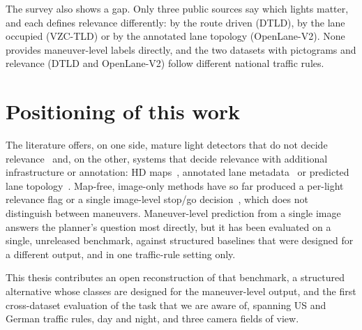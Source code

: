 The survey also shows a gap. Only three public sources say which lights matter, and each defines
relevance differently: by the route driven (DTLD), by the lane occupied (VZC-TLD) or by the annotated
lane topology (OpenLane-V2). None provides maneuver-level labels directly, and the two datasets with
pictograms and relevance (DTLD and OpenLane-V2) follow different national traffic rules.

\section{Positioning of this work}
\label{sec:bg-position}

The literature offers, on one side, mature light detectors that do not decide
relevance~\cite{behrendt2017deep,polley2024tldready} and, on the other, systems that decide relevance
with additional infrastructure or annotation: HD maps~\cite{fairfield2011traffic,polley2025atlas},
annotated lane metadata~\cite{langenberg2019deep} or predicted lane
topology~\cite{li2023graph,wu2024topomlp}. Map-free, image-only methods have so far produced a
per-light relevance flag or a single image-level stop/go decision~\cite{polley2024tldready,trinci2026color},
which does not distinguish between maneuvers. Maneuver-level prediction from a single
image~\cite{zou2026oneperception} answers the planner's question most directly, but it has been
evaluated on a single, unreleased benchmark, against structured baselines that were designed for a
different output, and in one traffic-rule setting only.

This thesis contributes an open reconstruction of that benchmark, a structured alternative whose
classes are designed for the maneuver-level output, and
the first cross-dataset evaluation of the task that we are aware of, spanning US and German traffic
rules, day and night, and three camera fields of view.

